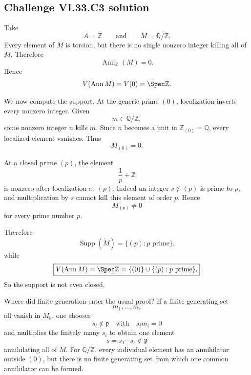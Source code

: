 \subsection*{Challenge VI.33.C3 solution}
\begin{solution}
Take
\[
A=\mathbb Z
\qquad\text{and}\qquad
M=\mathbb Q/\mathbb Z.
\]
Every element of \(M\) is torsion, but there is no single nonzero integer killing all of \(M\). Therefore
\[
\operatorname{Ann}_{\mathbb Z}(M)=0.
\]
Hence
\[
V(\operatorname{Ann}M)=V(0)=\Spec\mathbb Z.
\]

We now compute the support.  At the generic prime \((0)\), localization inverts every nonzero integer.  Given
\[
m\in\mathbb Q/\mathbb Z,
\]
some nonzero integer \(n\) kills \(m\).  Since \(n\) becomes a unit in \(\mathbb Z_{(0)}=\mathbb Q\), every
localized element vanishes. Thus
\[
M_{(0)}=0.
\]

At a closed prime \((p)\), the element
\[
\frac1p+\mathbb Z
\]
is nonzero after localization at \((p)\).  Indeed an integer \(s\notin(p)\) is prime to \(p\), and multiplication
by \(s\) cannot kill this element of order \(p\). Hence
\[
M_{(p)}\ne0
\]
for every prime number \(p\).

Therefore
\[
\boxed{
\operatorname{Supp}(\widetilde M)
=
\{(p):p\text{ prime}\},
}
\]
while
\[
\boxed{
V(\operatorname{Ann}M)
=
\Spec\mathbb Z
=
\{(0)\}\cup\{(p):p\text{ prime}\}.
}
\]
So the support is not even closed.

Where did finite generation enter the usual proof?  If a finite generating set
\[
m_1,\ldots,m_r
\]
all vanish in \(M_{\mathfrak p}\), one chooses
\[
s_i\notin\mathfrak p
\quad\text{with}\quad
s_i m_i=0
\]
and multiplies the finitely many \(s_i\) to obtain one element
\[
s=s_1\cdots s_r\notin\mathfrak p
\]
annihilating all of \(M\).  For \(\mathbb Q/\mathbb Z\), every individual element has an annihilator outside
\((0)\), but there is no finite generating set from which one common annihilator can be formed.
\end{solution}

